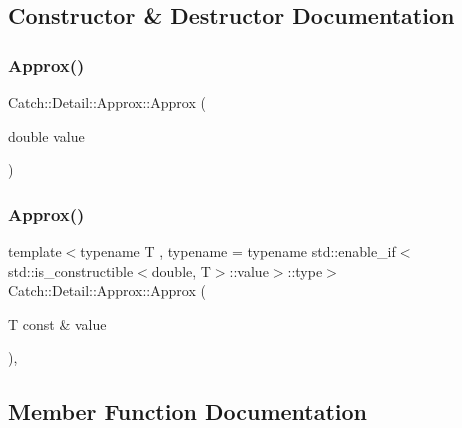 \subsection{Constructor \& Destructor Documentation}
\mbox{\label{class_catch_1_1_detail_1_1_approx_a1a8618ea8db08c66bd3d9fe8f74b957a}} 
\subsubsection{Approx()\hspace{0.1cm}{\footnotesize\ttfamily [1/2]}}
{\footnotesize\ttfamily Catch\+::\+Detail\+::\+Approx\+::\+Approx (\begin{DoxyParamCaption}\item[{double}]{value }\end{DoxyParamCaption})\hspace{0.3cm}{\ttfamily [explicit]}}

\mbox{\label{class_catch_1_1_detail_1_1_approx_ab14b979fa8a37f21d037157fabed4072}} 
\subsubsection{Approx()\hspace{0.1cm}{\footnotesize\ttfamily [2/2]}}
{\footnotesize\ttfamily template$<$typename T , typename  = typename std\+::enable\+\_\+if$<$std\+::is\+\_\+constructible$<$double, T$>$\+::value$>$\+::type$>$ \\
Catch\+::\+Detail\+::\+Approx\+::\+Approx (\begin{DoxyParamCaption}\item[{T const \&}]{value }\end{DoxyParamCaption})\hspace{0.3cm}{\ttfamily [inline]}, {\ttfamily [explicit]}}



\subsection{Member Function Documentation}
\mbox{\label{class_catch_1_1_detail_1_1_approx_aaf86dc0ee92272ac2d9839197a07951d}} 
